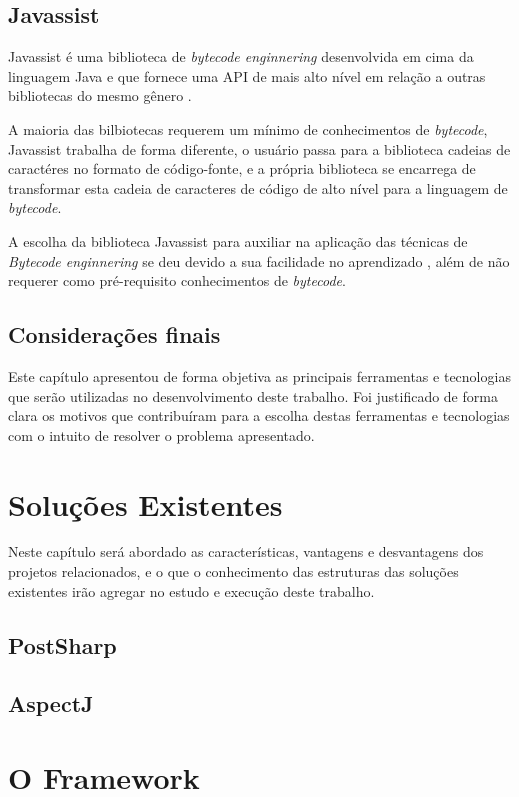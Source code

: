 \documentclass[tc,openright]{iiufrgs}
\begin{document}
\section{Javassist}

Javassist é uma biblioteca de \textit{bytecode enginnering} desenvolvida em cima da linguagem Java e que fornece uma API de mais alto nível em relação a outras bibliotecas do mesmo gênero \cite{javassist}.

A maioria das bilbiotecas requerem um mínimo de conhecimentos de \textit{bytecode}, Javassist trabalha de forma diferente, o usuário passa para a biblioteca cadeias de caractéres no formato de código-fonte, e a própria biblioteca se encarrega de transformar esta cadeia de caracteres de código de alto nível para a linguagem de \textit{bytecode}.

A escolha da biblioteca Javassist para auxiliar na aplicação das técnicas de \textit{Bytecode enginnering} se deu devido a sua facilidade no aprendizado , além de não requerer como pré-requisito conhecimentos de \textit{bytecode}.

\section{Considerações finais}

Este capítulo apresentou de forma objetiva as principais ferramentas e tecnologias que serão utilizadas no desenvolvimento deste trabalho. Foi justificado de forma clara os motivos que contribuíram para a escolha destas ferramentas e tecnologias com o intuito de resolver o problema apresentado.

\chapter{Soluções Existentes}
Neste capítulo será abordado as características, vantagens e desvantagens dos projetos relacionados, e o que o conhecimento das estruturas das soluções existentes irão agregar no estudo e execução deste trabalho.

\section{PostSharp}

\section{AspectJ}

\chapter{O Framework}
\end{document}
